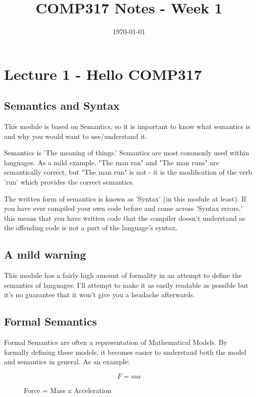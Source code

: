 \documentclass[12pt]{article}
\date{\today}
\title{COMP317 Notes - Week 1}
\begin{document}
\maketitle
\tableofcontents


\section{Lecture 1 - Hello COMP317}
\label{sec-1}
\subsection{Semantics and Syntax}
\label{sec-1-1}
This module is based on Semantics, so it is important to know what semantics is
and why you would want to use/understand it.

Semantics is 'The meaning of things.'  Semantics are most commonly used within
languages.  As a mild example, "The man ran" and "The man runs" are
semantically correct, but "The man run" is not - it is the modification of the
verb 'run' which provides the correct semantics.

The written form of semantics is known as 'Syntax' (in this module at least).
If you have ever compiled your own code before and come across 'Syntax errors,'
this means that you have written code that the compiler doesn't understand as
the offending code is not a part of the language's syntax.

\subsection{A mild warning}
\label{sec-1-2}
This module has a fairly high amount of formality in an attempt to define
the semantics of languages.  I'll attempt to make it as easily readable as
possible but it's no guarantee that it won't give you a headache afterwards.

\subsection{Formal Semantics}
\label{sec-1-3}
Formal Semantics are often a representation of Mathematical Models.  By
formally defining these models, it becomes easier to understand both the model
and semantics in general.  As an example:

\begin{figure}
\begin{equation}
F = ma
\end{equation}
\caption{Force = Mass x Acceleration}
\end{figure}
\end{document}

